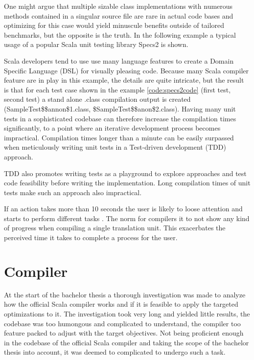 \documentclass{VUMIFPSbakalaurinis}
\begin{document}
One might argue that multiple sizable class implementations with numerous methods contained in a singular source file are rare in actual code bases and optimizing for this case would yield minuscule benefits outside of tailored benchmarks, but the opposite is the truth. %
In the following example a typical usage of a popular Scala unit testing library Specs2 \cite{Specs2Github} is shown.



Scala developers tend to use use many language features to create a Domain Specific Language (DSL) for visually pleasing code.
Because many Scala compiler feature are in play in this example, the details are quite intricate, but the result is that for each test case shown in the example \ref{code:specs2code} (first test, second test) a stand alone .class compilation output is created (SampleTest\$\$annon\$1.class, \$SampleTest\$\$anon\$2.class).
Having many unit tests in a sophisticated codebase can therefore increase the compilation times significantly, to a point where an iterative development process becomes impractical.
Compilation times longer than a minute can be easily surpassed when meticulously writing unit tests in a Test-driven development (TDD) approach.

TDD also promotes writing tests as a playground to explore approaches and test code feasibility before writing the implementation.
Long compilation times of unit tests make such an approach also impractical.

If an action takes more than 10 seconds the user is likely to loose attention and starts to perform different tasks \cite{Usability}.
The norm for compilers it to not show any kind of progress when compiling a single translation unit.
This exacerbates the perceived time it takes to complete a process for the user\cite{Usability}.

\section{Compiler}
At the start of the bachelor thesis a thorough investigation was made to analyze how the official Scala compiler works \cite{ScalaGithub} and if it is feasible to apply the targeted optimizations to it.
The investigation took very long and yielded little results, the codebase was too humongous and complicated to understand, the compiler too feature packed to adjust with the target objectives.
Not being proficient enough in the codebase of the official Scala compiler and taking the scope of the bachelor thesis into account, it was deemed to complicated to undergo such a task.
\end{document}
